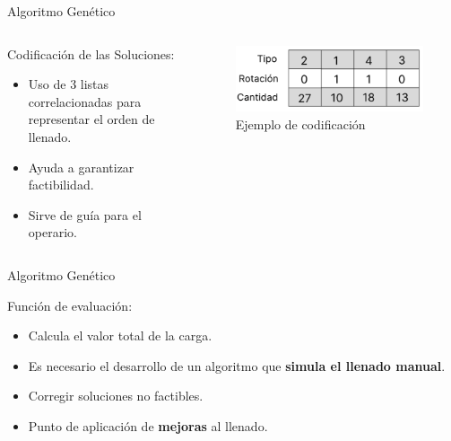 \documentclass{beamer}
\begin{document}
\begin{frame}{Algoritmo Genético}
    \begin{columns}
        \begin{column}{0.6\textwidth}
            \begin{exampleblock}{Codificación de las Soluciones:}
                \begin{itemize}[<+-| alert@+>]
                    \item Uso de 3 listas correlacionadas para representar el orden de llenado.
                    \item Ayuda a garantizar factibilidad.
                    \item Sirve de guía para el operario.
                \end{itemize}
            \end{exampleblock}
        \end{column}
        \begin{column}{0.4\textwidth}
            \begin{figure}
                \centering
                \includegraphics[width=1\textwidth]{pic/codificacion.png}
                \caption*{Ejemplo de codificación}
                \label{fig:codificacion}
            \end{figure}
        \end{column}
    \end{columns}
\end{frame}

\begin{frame}{Algoritmo Genético}
    \begin{exampleblock}{Función de evaluación:}
        \begin{itemize}[<+-| alert@+>]
            \item Calcula el valor total de la carga.
            \item Es necesario el desarrollo de un algoritmo que \textbf{simula el llenado manual}.
            \item Corregir soluciones no factibles.
            \item Punto de aplicación de \textbf{mejoras} al llenado.
        \end{itemize}
    \end{exampleblock}
\end{frame}
\end{document}
